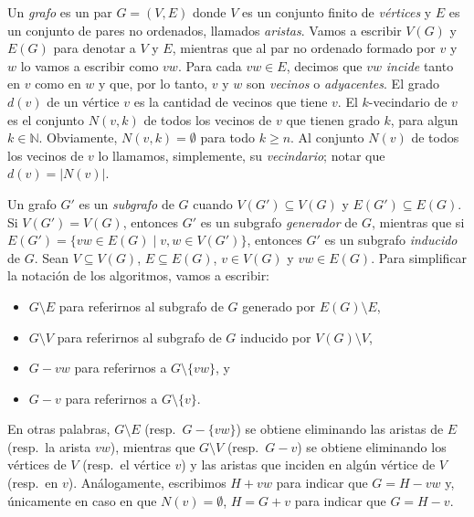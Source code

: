 \documentclass[%
    a4paper,%
    fontsize=12pt,%
    DIV=12,
    twoside,%
    openright,%
    titlepage=true,%
    headsepline,%
    toc=bibliography,%
    parskip=half,%
    cleardoublepage=empty,%
    headings=big,%
]{scrbook}
\begin{document}
Un \emph{grafo} es un par $G = (V, E)$ donde $V$ es un conjunto finito de \emph{vértices} y $E$ es un conjunto de pares no ordenados, llamados \emph{aristas}.  Vamos a escribir $V(G)$ y $E(G)$ para denotar a $V$ y $E$, mientras que al par no ordenado formado por $v$ y $w$ lo vamos a escribir como $vw$.  Para cada $vw \in E$, decimos que $vw$ \emph{incide} tanto en $v$ como en $w$ y que, por lo tanto, $v$ y $w$ son \emph{vecinos} o \emph{adyacentes}.  El grado $d(v)$ de un vértice $v$ es la cantidad de vecinos que tiene $v$.  El $k$-vecindario de $v$ es el conjunto $N(v, k)$ de todos los vecinos de $v$ que tienen grado $k$, para algun $k \in \mathbb{N}$.  Obviamente, $N(v,k) = \emptyset$ para todo $k \geq n$.  Al conjunto $N(v)$ de todos los vecinos de $v$ lo llamamos, simplemente, su \emph{vecindario}; notar que $d(v) = |N(v)|$.


Un grafo $G'$ es un \emph{subgrafo} de $G$ cuando $V(G') \subseteq V(G)$ y $E(G') \subseteq E(G)$.  Si $V(G') = V(G)$, entonces $G'$ es un subgrafo \emph{generador} de $G$, mientras que si $E(G') = \{vw \in E(G) \mid v,w \in V(G')\}$, entonces $G'$ es un subgrafo \emph{inducido} de $G$.  Sean $V \subseteq V(G)$, $E \subseteq E(G)$, $v \in V(G)$ y $vw \in E(G)$.  Para simplificar la notación de los algoritmos, vamos a escribir:
\begin{itemize}
  \item $G \setminus E$ para referirnos al subgrafo de $G$ generado por $E(G) \setminus E$, 
  \item $G \setminus V$ para referirnos al subgrafo de $G$ inducido por $V(G) \setminus V$, 
  \item $G - vw$ para referirnos a $G \setminus \{vw\}$, y 
  \item $G - v$ para referirnos a $G \setminus \{v\}$.
\end{itemize}
En otras palabras, $G \setminus E$ (resp.\ $G - \{vw\}$) se obtiene eliminando las aristas de $E$ (resp.\ la arista $vw$), mientras que $G \setminus V$ (resp.\ $G - v$) se obtiene eliminando los vértices de $V$ (resp.\ el vértice $v$) y las aristas que inciden en algún vértice de $V$ (resp.\ en $v$). Análogamente, escribimos $H + vw$ para indicar que $G = H - vw$ y, únicamente en caso en que $N(v) = \emptyset$, $H = G + v$ para indicar que $G = H - v$.  
\end{document}
